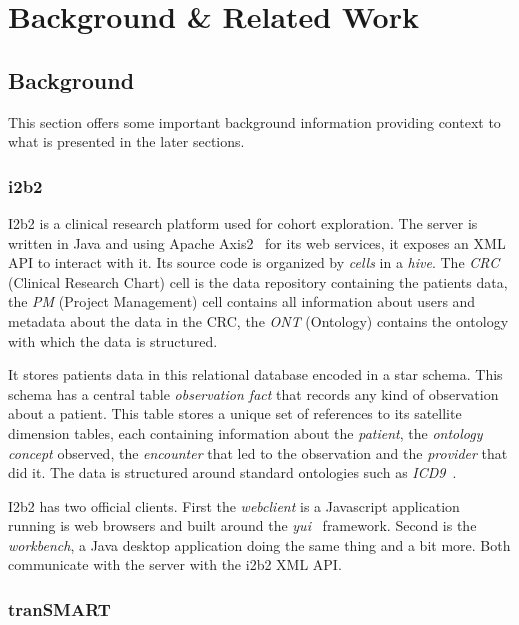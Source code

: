 \chapter{Background \& Related Work}
\label{sec:bg-relwork}

\section{Background}
This section offers some important background information providing context to what is presented in the later sections. 

\subsection{i2b2}
\label{sec:bg-i2b2}

I2b2 is a clinical research platform used for cohort exploration.
The server is written in Java and using Apache Axis2~\cite{todo} for its web services, it exposes an XML API to interact with it.
Its source code is organized by \emph{cells} in a \emph{hive}.
The \emph{CRC} (Clinical Research Chart) cell is the data repository containing the patients data, the \emph{PM} (Project Management) cell contains all information about users and metadata about the data in the CRC, the \emph{ONT} (Ontology) contains the ontology with which the data is structured.

It stores patients data in this relational database encoded in a star schema.
This schema has a central table \emph{observation fact} that records any kind of observation about a patient.
This table stores a unique set of references to its satellite dimension tables, each containing information about the \emph{patient}, the \emph{ontology concept} observed, the \emph{encounter} that led to the observation and the \emph{provider} that did it.
The data is structured around standard ontologies such as \emph{ICD9}~\cite{todo}.

I2b2 has two official clients.
First the \emph{webclient} is a Javascript application running is web browsers and built around the \emph{yui}~\cite{todo} framework.
Second is the \emph{workbench}, a Java desktop application doing the same thing and a bit more.
Both communicate with the server with the i2b2 XML API.

\subsection{tranSMART}

